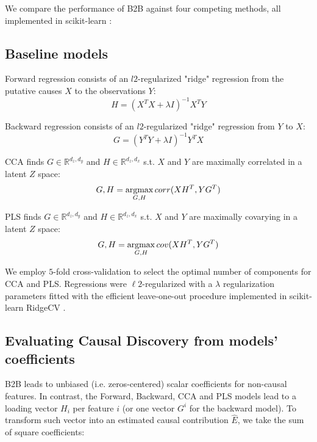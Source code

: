 We compare the performance of B2B against four competing methods, all
implemented in scikit-learn \citep{scikit}:
%

\subsection{Baseline models}

Forward regression consists of an $l2$-regularized "ridge" regression from the
putative causes $X$ to the observations $Y$: \begin{equation} H = (X^T X
+\lambda I)^{-1} X^T Y \end{equation}

Backward regression consists of an $l2$-regularized "ridge" regression from $Y$
to $X$: \begin{equation} G = (Y^T Y +\lambda I)^{-1} Y^T X \end{equation}

CCA finds $G\in\mathbb{R}^{d_z, d_y}$ and $H\in\mathbb{R}^{d_z, d_x}$
s.t.
$X$ and $Y$ are maximally correlated in a latent $Z$ space:
\begin{equation} G,H = \operatorname*{argmax}_{G,H} corr(XH^T, YG^T) \end{equation}

PLS finds $G\in\mathbb{R}^{d_z, d_y}$ and $H\in\mathbb{R}^{d_z, d_x}$
s.t.
$X$ and $Y$ are maximally covarying in a latent $Z$ space:
\begin{equation} G,H = \operatorname*{argmax}_{G,H} cov(XH^T, YG^T) \end{equation}

We employ $5$-fold cross-validation to select the optimal number of components
for CCA and PLS. Regressions were $\ell2$-regularized with a $\lambda$ regularization
parameters fitted with the efficient leave-one-out procedure implemented in
scikit-learn RidgeCV \citep{scikit}.

\subsection{Evaluating Causal Discovery from models' coefficients}

B2B leads to unbiased (i.e. zeros-centered) scalar coefficients for non-causal
features. In contrast, the Forward, Backward, CCA and PLS models lead to a
loading vector $H_i$ per feature $i$ (or one vector $G^i$ for the backward
model). To transform such vector into an estimated causal contribution $\hat E$,
we take the sum of square coefficients:

